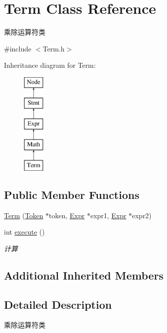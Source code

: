 \hypertarget{class_term}{}\section{Term Class Reference}
\label{class_term}


乘除运算符类  




{\ttfamily \#include $<$Term.\+h$>$}

Inheritance diagram for Term\+:\begin{figure}[H]
\begin{center}
\leavevmode
\includegraphics[height=5.000000cm]{class_term}
\end{center}
\end{figure}
\subsection*{Public Member Functions}
\begin{DoxyCompactItemize}
\item 
\hyperlink{class_term_aee8491368db463879893b7f374d5d835}{Term} (\hyperlink{class_token}{Token} $\ast$token, \hyperlink{class_expr}{Expr} $\ast$expr1, \hyperlink{class_expr}{Expr} $\ast$expr2)
\item 
\mbox{\label{class_term_ac2d20115da73f9425e5d390856a211a1}} 
int \hyperlink{class_term_ac2d20115da73f9425e5d390856a211a1}{execute} ()
\begin{DoxyCompactList}\small\item\em 计算 \end{DoxyCompactList}\end{DoxyCompactItemize}
\subsection*{Additional Inherited Members}


\subsection{Detailed Description}
乘除运算符类 

